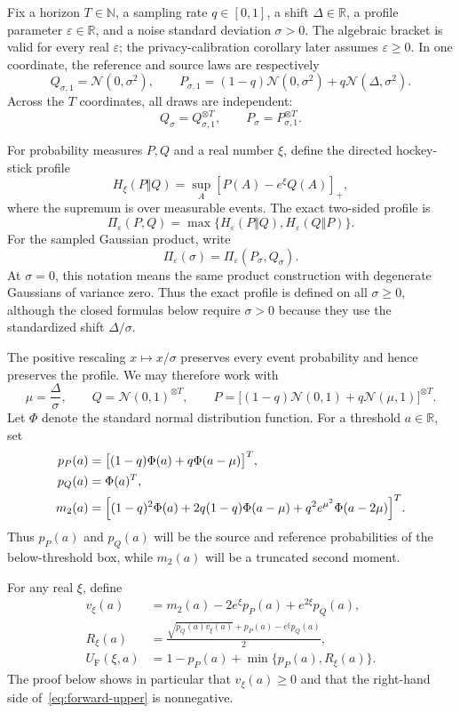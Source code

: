 \documentclass[11pt]{article}
\theoremstyle{remark}
\newcommand{\R}{\mathbb R}
\newcommand{\N}{\mathbb N}
\newcommand{\Normal}{\mathcal N}
\newcommand{\pos}[1]{\left[#1\right]_{+}}
\begin{document}
Fix a horizon $T\in\N$, a sampling rate $q\in[0,1]$, a shift
$\Delta\in\R$, a profile parameter $\varepsilon\in\R$, and a noise standard
deviation $\sigma>0$.  The algebraic bracket is valid for every real
$\varepsilon$; the privacy-calibration corollary later assumes
$\varepsilon\geq0$.  In one coordinate, the reference and source laws are
respectively
\[
  Q_{\sigma,1}=\Normal(0,\sigma^2),
  \qquad
  P_{\sigma,1}=(1-q)\Normal(0,\sigma^2)
       +q\Normal(\Delta,\sigma^2).
\]
Across the $T$ coordinates, all draws are independent:
\[
  Q_\sigma=Q_{\sigma,1}^{\otimes T},
  \qquad
  P_\sigma=P_{\sigma,1}^{\otimes T}.
\]

For probability measures $P,Q$ and a real number $\xi$, define the directed
hockey-stick profile
\[
  H_\xi(P\Vert Q)
  =\sup_A\pos{P(A)-e^\xi Q(A)},
\]
where the supremum is over measurable events.  The exact two-sided profile is
\[
  \Pi_\varepsilon(P,Q)
  =\max\{H_\varepsilon(P\Vert Q),H_\varepsilon(Q\Vert P)\}.
\]
For the sampled Gaussian product, write
\[
  \Pi_\varepsilon(\sigma)=\Pi_\varepsilon(P_\sigma,Q_\sigma).
\]
At $\sigma=0$, this notation means the same product construction with
degenerate Gaussians of variance zero.  Thus the exact profile is defined on
all $\sigma\geq0$, although the closed formulas below require $\sigma>0$
because they use the standardized shift $\Delta/\sigma$.

The positive rescaling $x\mapsto x/\sigma$ preserves every event probability
and hence preserves the profile.  We may therefore work with
\[
  \mu=\frac{\Delta}{\sigma},
  \qquad
  Q=\Normal(0,1)^{\otimes T},
  \qquad
  P=\bigl[(1-q)\Normal(0,1)+q\Normal(\mu,1)\bigr]^{\otimes T}.
\]
Let $\Phi$ denote the standard normal distribution function.  For a threshold
$a\in\R$, set
\begin{align}
  p_P(a)&=\bigl[(1-q)\Phi(a)+q\Phi(a-\mu)\bigr]^T,\label{eq:source-box-mass}\\
  p_Q(a)&=\Phi(a)^T,\label{eq:reference-box-mass}\\
  m_2(a)&=\Bigl[(1-q)^2\Phi(a)
      +2q(1-q)\Phi(a-\mu)
      +q^2e^{\mu^2}\Phi(a-2\mu)\Bigr]^T.\label{eq:second-moment}
\end{align}
Thus $p_P(a)$ and $p_Q(a)$ will be the source and reference probabilities of the
below-threshold box, while $m_2(a)$ will be a truncated second moment.

For any real $\xi$, define
\begin{align}
  v_\xi(a)
    &=m_2(a)-2e^\xi p_P(a)+e^{2\xi}p_Q(a),\label{eq:centered-moment}\\
  R_\xi(a)
    &=\frac{\sqrt{p_Q(a)v_\xi(a)}+p_P(a)-e^\xi p_Q(a)}{2},\label{eq:residual-bound}\\
  U_{\mathrm F}(\xi,a)
    &=1-p_P(a)+\min\{p_P(a),R_\xi(a)\}.\label{eq:forward-upper}
\end{align}
The proof below shows in particular that $v_\xi(a)\geq0$ and that the
right-hand side of~\eqref{eq:forward-upper} is nonnegative.
\end{document}
